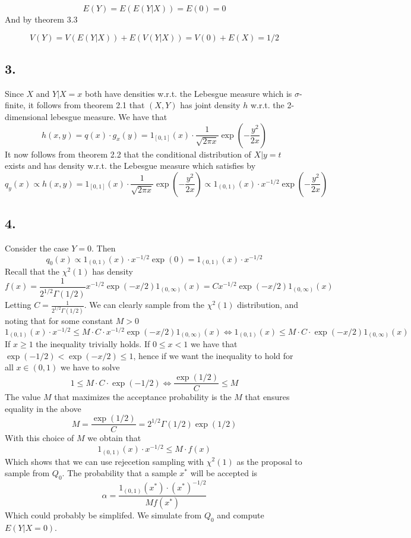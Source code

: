 \documentclass[
]{article}
\begin{document}
\[
E(Y) = E(E(Y|X)) = E(0) = 0
\] And by theorem 3.3

\[
V(Y) = V(E(Y|X)) + E(V(Y|X)) = V(0) + E(X) = 1/2
\]

\hypertarget{section-2}{%
\subsection{3.}\label{section-2}}

Since \(X\) and \(Y | X = x\) both have densities w.r.t. the Lebesgue
measure which is \(\sigma\)-finite, it follows from theorem 2.1 that
\((X,Y)\) has joint density \(h\) w.r.t. the 2-dimensional lebesgue
measure. We have that \[
h(x,y) = q(x) \cdot g_x(y) = 1_{[0,1]}(x) \cdot \frac{1}{\sqrt{2\pi x}} \exp(-\frac{y^2}{2x} )
\] It now follows from theorem 2.2 that the conditional distribution of
\(X | y = t\) exists and has density w.r.t. the Lebesgue measure which
satisfies by \[
q_y(x) \propto h(x,y) = 1_{[0,1]}(x) \cdot \frac{1}{\sqrt{2\pi x}} \exp(-\frac{y^2}{2x} ) \propto 1_{(0,1)}(x) \cdot x^{-1/2} \exp(-\frac{y^2}{2x} )
\]

\hypertarget{section-3}{%
\subsection{4.}\label{section-3}}

Consider the case \(Y = 0\). Then \[
q_0(x) \propto 1_{(0,1)}(x) \cdot x^{-1/2} \exp(0) = 1_{(0,1)}(x) \cdot x^{-1/2}
\] Recall that the \(\chi^2(1)\) has density \[
f(x) = \frac{1}{2^{1/2}\Gamma(1/2)} x^{-1/2} \exp(-x/2) 1_{(0,\infty)}(x) = C x^{-1/2} \exp(-x/2) 1_{(0,\infty)}(x)
\] Letting \(C = \frac{1}{2^{1/2}\Gamma(1/2)}\). We can clearly sample
from the \(\chi^2(1)\) distribution, and noting that for some constant
\(M > 0\) \[
1_{(0,1)}(x) \cdot x^{-1/2} \leq M \cdot C \cdot x^{-1/2} \exp(-x/2) 1_{(0,\infty)}(x) \Leftrightarrow 1_{(0,1)}(x) \leq M \cdot C \cdot  \exp(-x/2) 1_{(0,\infty)}(x)
\] If \(x \geq 1\) the inequality trivially holds. If \(0 \leq x < 1\)
we have that \(\exp(-1/2) < \exp(-x/2) \leq 1\), hence if we want the
inequality to hold for all \(x \in (0,1)\) we have to solve \[
1 \leq M \cdot C \cdot \exp(-1/2) \Leftrightarrow \frac{\exp(1/2)}{C} \leq M 
\] The value \(M\) that maximizes the acceptance probability is the
\(M\) that ensures equality in the above \[
M = \frac{\exp(1/2)}{C} = 2^{1/2}\Gamma(1/2) \exp(1/2)
\] With this choice of \(M\) we obtain that \[
1_{(0,1)}(x) \cdot x^{-1/2} \leq M \cdot f(x)
\] Which shows that we can use rejecetion sampling with \(\chi^2(1)\) as
the proposal to sample from \(Q_0\). The probability that a sample
\(x^*\) will be accepted is \[
\alpha = \frac{1_{(0,1)}(x^*) \cdot (x^*)^{-1/2}}{Mf(x^*)}
\] Which could probably be simplifed. We simulate from \(Q_0\) and
compute \(E(Y| X= 0 )\).
\end{document}
